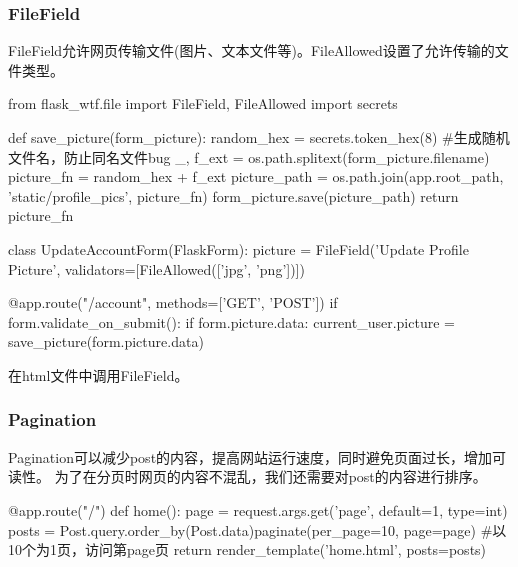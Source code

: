     \subsubsection{FileField}
      FileField允许网页传输文件(图片、文本文件等)。FileAllowed设置了允许传输的文件类型。
      \begin{codeblock}[language=python, caption={FileField}]
        from flask_wtf.file import FileField, FileAllowed
        import secrets

        def save_picture(form_picture):
            random_hex = secrets.token_hex(8) #生成随机文件名，防止同名文件bug
            _, f_ext = os.path.splitext(form_picture.filename)
            picture_fn = random_hex + f_ext
            picture_path = os.path.join(app.root_path, 'static/profile_pics', picture_fn)
            form_picture.save(picture_path)
            return picture_fn

        class UpdateAccountForm(FlaskForm):
            picture = FileField('Update Profile Picture', 
                                validators=[FileAllowed(['jpg', 'png'])])

        @app.route("/account", methods=['GET', 'POST'])
            if form.validate_on_submit():
                if form.picture.data:
                    current_user.picture = save_picture(form.picture.data)
      \end{codeblock}

      在html文件中调用FileField。

    \subsubsection{Pagination}
      Pagination可以减少post的内容，提高网站运行速度，同时避免页面过长，增加可读性。
      为了在分页时网页的内容不混乱，我们还需要对post的内容进行排序。
      \begin{codeblock}[language=python, caption={paginate}]
        @app.route("/")
        def home():
            page = request.args.get('page', default=1, type=int)
            posts = Post.query.order_by(Post.data)paginate(per_page=10, page=page) 
            #以10个为1页，访问第page页
            return render_template('home.html', posts=posts)
      \end{codeblock}


